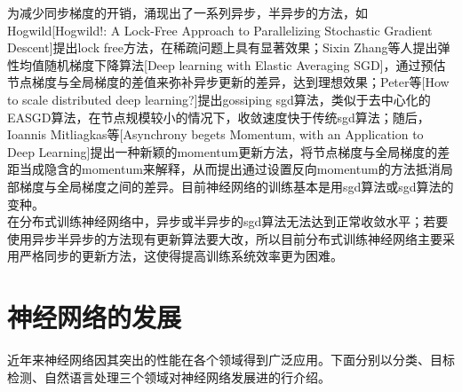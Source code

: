 为减少同步梯度的开销，涌现出了一系列异步，半异步的方法，如Hogwild[Hogwild!: A Lock-Free Approach to Parallelizing Stochastic Gradient Descent]提出lock free方法，在稀疏问题上具有显著效果；Sixin Zhang等人提出弹性均值随机梯度下降算法[Deep learning with Elastic Averaging SGD]，通过预估节点梯度与全局梯度的差值来弥补异步更新的差异，达到理想效果；Peter等[How to scale distributed deep learning?]提出gossiping sgd算法，类似于去中心化的EASGD算法，在节点规模较小的情况下，收敛速度快于传统sgd算法；随后，Ioannis Mitliagkas等[Asynchrony begets Momentum, with an Application to Deep Learning]提出一种新颖的momentum更新方法，将节点梯度与全局梯度的差距当成隐含的momentum来解释，从而提出通过设置反向momentum的方法抵消局部梯度与全局梯度之间的差异。目前神经网络的训练基本是用sgd算法或sgd算法的变种。\\
在分布式训练神经网络中，异步或半异步的sgd算法无法达到正常收敛水平；若要使用异步半异步的方法现有更新算法要大改，所以目前分布式训练神经网络主要采用严格同步的更新方法，这使得提高训练系统效率更为困难。
\section{神经网络的发展}
近年来神经网络因其突出的性能在各个领域得到广泛应用。下面分别以分类、目标检测、自然语言处理三个领域对神经网络发展进的行介绍。
